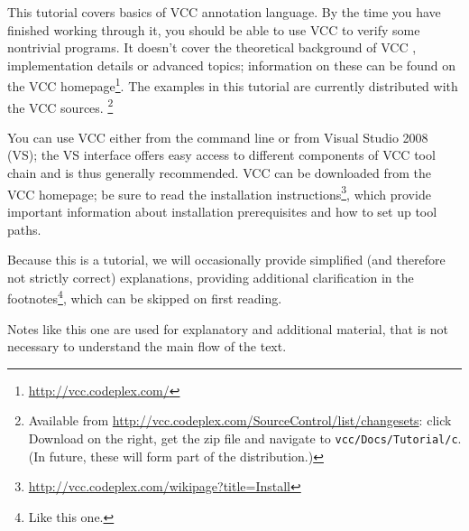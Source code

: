 This tutorial covers basics of VCC annotation language. By the time
you have finished working through it, you should be able to use VCC to
verify some nontrivial programs. It doesn't cover the theoretical
background of VCC \cite{lci}, implementation details \cite{vcc}
or advanced topics;
information on these can be found on the VCC
homepage\footnote{\url{http://vcc.codeplex.com/}}.
%
%
The examples in this tutorial are currently distributed with the VCC sources.%
\footnote{
Available from \url{http://vcc.codeplex.com/SourceControl/list/changesets}: click Download on the right,
get the zip file and navigate to \lstinline|vcc/Docs/Tutorial/c|. (In
future, these will form part of the distribution.)}

You can use VCC either from the command line or from Visual Studio
2008 (VS); the VS interface offers easy access to different components of
VCC tool chain and is thus generally recommended.
VCC can be downloaded from the VCC homepage; 
be sure to read the installation instructions\footnote{\url{http://vcc.codeplex.com/wikipage?title=Install}},
which provide important information about installation prerequisites 
and how to set up tool paths.



Because this is a tutorial, we will occasionally provide simplified (and
therefore not strictly correct) explanations, providing
additional clarification in the footnotes\footnote{Like this one.},
which can be skipped on first reading. 
\begin{note}
Notes like this one are used for explanatory and additional material,
that is not necessary to understand the main flow of the text.
\end{note}

